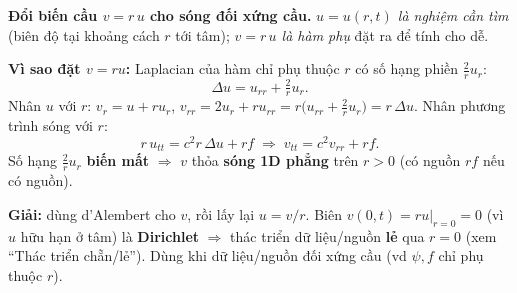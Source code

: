 \textbf{Đổi biến cầu $v=r\,u$ cho sóng đối xứng cầu.}
\emph{$u=u(r,t)$ là nghiệm cần tìm} (biên độ tại khoảng cách $r$ tới tâm); \emph{$v=r\,u$ là hàm phụ} đặt ra để tính cho dễ.

\textbf{Vì sao đặt $v=ru$:} Laplacian của hàm chỉ phụ thuộc $r$ có số hạng phiền $\tfrac{2}{r}u_r$:
\[
  \Delta u = u_{rr}+\tfrac{2}{r}u_r .
\]
Nhân $u$ với $r$: $v_r=u+ru_r$, $v_{rr}=2u_r+ru_{rr}=r\big(u_{rr}+\tfrac{2}{r}u_r\big)=r\,\Delta u$. Nhân phương trình sóng với $r$:
\[
  r\,u_{tt}=c^2 r\,\Delta u+rf \;\Longrightarrow\; v_{tt}=c^2 v_{rr}+rf .
\]
Số hạng $\tfrac{2}{r}u_r$ \textbf{biến mất} $\Rightarrow$ $v$ thỏa \textbf{sóng 1D phẳng} trên $r>0$ (có nguồn $rf$ nếu có nguồn).

\textbf{Giải:} dùng d'Alembert cho $v$, rồi lấy lại $u=v/r$. Biên $v(0,t)=ru\big|_{r=0}=0$ (vì $u$ hữu hạn ở tâm) là \textbf{Dirichlet} $\Rightarrow$ thác triển dữ liệu/nguồn \textbf{lẻ} qua $r=0$ (xem ``Thác triển chẵn/lẻ'').
Dùng khi dữ liệu/nguồn đối xứng cầu (vd $\psi,f$ chỉ phụ thuộc $r$).
